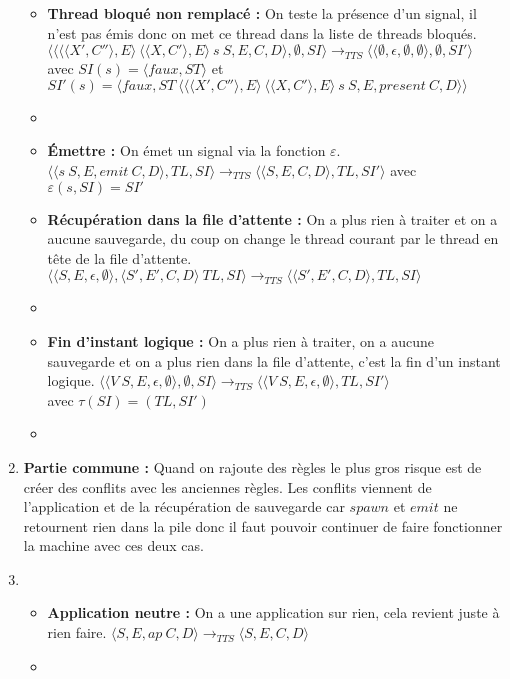 \documentclass[10pt,a4paper]{article}
\begin{document}
\begin{enumerate}
\begin{itemize}
						\item[] \textbf{Thread bloqué non remplacé :} On teste la présence d'un signal, il n'est pas émis donc on met ce thread dans la liste de threads bloqués.
						\smallbreak 
						$\langle\langle \langle\langle X',C''\rangle,E\rangle~\langle\langle X,C'\rangle,E\rangle~s~S,E,C,D\rangle,\emptyset,SI\rangle 
						\longrightarrow_{TTS} 
						\langle\langle \emptyset,\epsilon,\emptyset,\emptyset\rangle,\emptyset,SI'\rangle$
						\\avec $SI(s) = \langle faux,ST\rangle$
						et $SI'(s) = \langle faux,ST~\langle\langle\langle X',C''\rangle,E\rangle~\langle\langle X,C'\rangle,E\rangle~s~S,E,present~C,D\rangle\rangle$
						\item[]
						
						\item[] \textbf{Émettre :} On émet un signal via la fonction $\varepsilon$.
						\smallbreak 
						$\langle\langle s~S,E,emit~C,D\rangle,TL,SI\rangle 
						\longrightarrow_{TTS}
						\langle\langle S,E,C,D\rangle,TL,SI'\rangle$
						avec $\varepsilon(s,SI) = SI'$
							
						\item[] \textbf{Récupération dans la file d'attente :} On a plus rien à traiter et on a aucune sauvegarde, du coup on change le thread courant par le thread en tête de la file d'attente.
						\smallbreak
						$\langle\langle S,E,\epsilon,\emptyset\rangle,\langle S',E',C,D\rangle~TL,SI\rangle 
						\longrightarrow_{TTS} 
						\langle\langle S',E',C,D\rangle,TL,SI\rangle$
						\item[]
							
						\item[] \textbf{Fin d'instant logique :} On a plus rien à traiter, on a aucune sauvegarde et on a plus rien dans la file d'attente, c'est la fin d'un instant logique.
						\smallbreak
						$\langle\langle V~S,E,\epsilon,\emptyset \rangle ,\emptyset,SI\rangle 
						\longrightarrow_{TTS} 
						\langle\langle V~S,E,\epsilon,\emptyset\rangle,TL,SI'\rangle$
						\\avec $\tau(SI) = (TL,SI')$ 
						\item[]
							
					\end{itemize}
					\item[] \textbf{Partie commune :} Quand on rajoute des règles le plus gros risque est de créer des conflits avec les anciennes règles. Les conflits viennent de l'application et de la récupération de sauvegarde car $spawn$ et $emit$ ne retournent rien dans la pile donc il faut pouvoir continuer de faire fonctionner la machine avec ces deux cas. 
					\item[]
					\begin{itemize}
						\item[] \textbf{Application neutre :} On a une application sur rien, cela revient juste à rien faire.
						\smallbreak 
						$\langle S,E,ap~C,D\rangle
						\longrightarrow_{TTS} 
						\langle S,E,C,D\rangle$
						\item[]
						

\end{itemize}
\end{enumerate}
\end{document}
